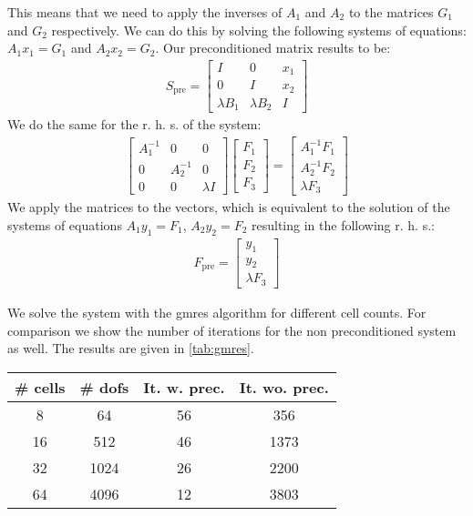 This means that we need to apply the inverses of $A_1$ and $A_2$ to the matrices $G_1$ and $G_2$ respectively. We can do this by solving the following systems of equations: $A_1 x_1 = G_1$ and $A_2 x_2 = G_2$. Our preconditioned matrix results to be:
\begin{align}
    S_{\text{pre}} = \begin{bmatrix}
        I & 0 & x_1\\
        0 & I & x_2\\
        \lambda B_1 & \lambda B_2 & I
    \end{bmatrix}
\end{align}
We do the same for the r. h. s. of the system:
\begin{align}
    \begin{bmatrix}
        A_1^{-1} & 0 & 0\\
        0 & A_2^{-1} & 0\\
        0 & 0&  \lambda I
    \end{bmatrix} \begin{bmatrix}
        F_1\\
        F_2\\
        F_3 \end{bmatrix} = \begin{bmatrix}
        A_1^{-1} F_1\\
        A_2^{-1} F_2\\
        \lambda F_3
    \end{bmatrix}
\end{align}
We apply the matrices to the vectors, which is equivalent to the solution of the systems of equations $A_1 y_1 = F_1$, $A_2 y_2 = F_2$ resulting in the following r. h. s.:
\begin{align}
    F_{\text{pre}} = \begin{bmatrix}
        y_1\\
        y_2\\
        \lambda F_3 \end{bmatrix}
\end{align}

We solve the system with the gmres algorithm for different cell counts. For comparison we show the number of iterations for the non preconditioned system as well. The results are given in \autoref{tab:gmres}.
\begin{center}
    \begin{tabular}{c|c|c|c}\label{tab:gmres}
        \# cells & \# dofs & It. w. prec. & It. wo. prec. \\
        \hline
        8   &  64  &  56 & 356 \\
        16  &  512 &  46 & 1373 \\
        32  & 1024 &  26 & 2200 \\
        64  & 4096 & 12  & 3803 \\
        \hline
    \end{tabular}
\end{center}

